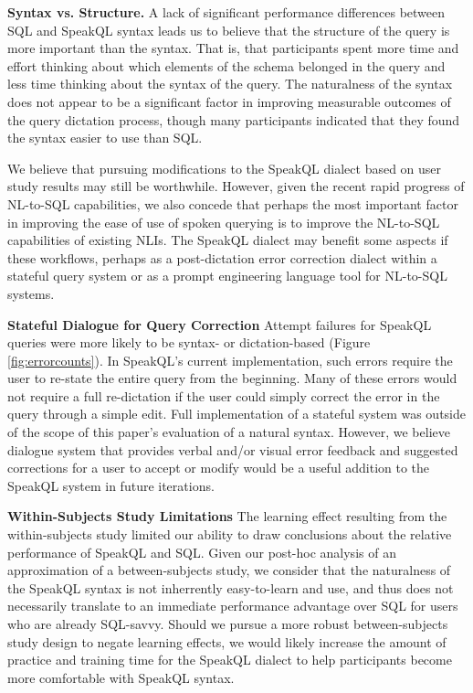 \textbf{Syntax vs. Structure.} A lack of significant performance differences between SQL and SpeakQL syntax leads us to believe that the structure of the query is more important than the syntax.
That is, that participants spent more time and effort thinking about which elements of the schema belonged in the query and less time thinking about the syntax of the query.
The naturalness of the syntax does not appear to be a significant factor in improving measurable outcomes of the query dictation process, though many participants indicated that they found the syntax easier to use than SQL. 

We believe that pursuing modifications to the SpeakQL dialect based on user study results may still be worthwhile. 
However, given the recent rapid progress of NL-to-SQL capabilities, we also concede that perhaps the most important factor in improving the ease of use of spoken querying is to improve the NL-to-SQL capabilities of existing NLIs.
The SpeakQL dialect may benefit some aspects if these workflows, perhaps as a post-dictation error correction dialect within a stateful query system or as a prompt engineering language tool for NL-to-SQL systems.

\textbf{Stateful Dialogue for Query Correction} Attempt failures for SpeakQL queries were more likely to be syntax- or dictation-based (Figure \ref{fig:errorcounts}). In SpeakQL's current implementation, such errors require the user to re-state the entire query from the beginning. Many of these errors would not require a full re-dictation if the user could simply correct the error in the query through a simple edit. Full  implementation of a stateful system was outside of the scope of this paper's evaluation of a natural syntax. However, we believe dialogue system that provides verbal and/or visual error feedback and suggested corrections for a user to accept or modify would be a useful addition to the SpeakQL system in future iterations.

\textbf{Within-Subjects Study Limitations} The learning effect resulting from the within-subjects study limited our ability to draw conclusions about the relative performance of SpeakQL and SQL. 
Given our post-hoc analysis of an approximation of a between-subjects study, we consider that the naturalness of the SpeakQL syntax is not inherrently easy-to-learn and use, and thus does not necessarily translate to an immediate performance advantage over SQL for users who are already SQL-savvy. 
Should we pursue a more robust between-subjects study design to negate learning effects, we would likely increase the amount of practice and training time for the SpeakQL dialect to help participants become more comfortable with SpeakQL syntax. 




